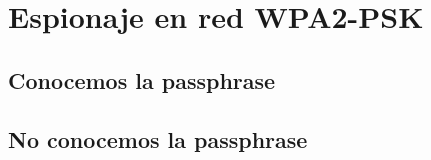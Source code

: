 \chapter{Espionaje en red WPA2-PSK}
\section{Conocemos la passphrase}

\section{No conocemos la passphrase}